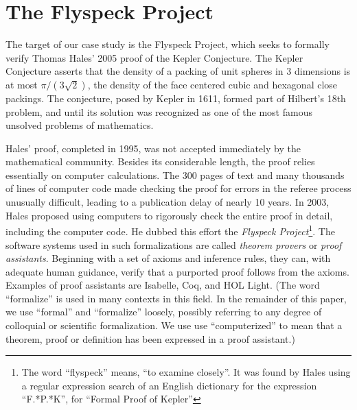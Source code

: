 
\section{The Flyspeck Project}
\label{sec:flyspeck}

\begin{figure}
  \centering
  \vspace{-.9cm}
  \vspace{-1.2cm}
\end{figure}


The target of our case study is the Flyspeck Project, which seeks to
formally verify Thomas Hales' 2005 proof of the Kepler Conjecture.
The Kepler Conjecture asserts that the density of a packing of unit
spheres in 3 dimensions is at most $\pi/(3\sqrt{2})$, the density of the face centered
cubic and hexagonal close packings.  The conjecture, posed by Kepler
in 1611, formed part of Hilbert's 18th problem, and until its solution
was recognized as one of the most famous unsolved problems of
mathematics.

Hales' proof, completed in 1995, was not accepted immediately by the
mathematical community.  Besides its considerable length, the proof
relies essentially on computer calculations.  The 300 pages of text
and many thousands of lines of computer code made checking the proof
for errors in the referee process unusually difficult, leading to a
publication delay of nearly 10 years.  In 2003, Hales proposed using
computers to rigorously check the entire proof in detail, including
the computer code.  He dubbed this effort the \textit{Flyspeck
  Project}\footnote{The word ``flyspeck'' means, ``to examine
  closely''.  It was found by Hales using a regular expression search
  of an English dictionary for the expression ``F.*P.*K'', for
  ``Formal Proof of Kepler''}.  The software systems used in such
formalizations are called \textit{theorem provers} or \textit{proof
  assistants}.  Beginning with a set of axioms and inference rules,
they can, with adequate human guidance, verify that a purported proof
follows from the axioms.  Examples of proof assistants are
Isabelle\cite{Paulson:1994:Isabelle}, Coq\cite{Bertot:2004:CoqBook},
and HOL Light\cite{Harrison:2000:HOL-Light}. (The word ``formalize'' is used
in many contexts in this field.  In the remainder of this paper, we
use ``formal'' and ``formalize'' loosely, possibly referring to 
any degree of colloquial or scientific formalization.  We use
use ``computerized'' to mean that a theorem, proof or definition has
been expressed in a proof assistant.)

